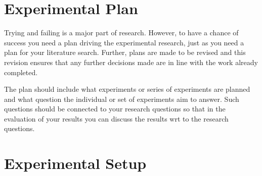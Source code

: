 \iffalse

\section{Experimental Plan}
\label{sec:experimentalPlan}

Trying and failing is a major part of research. However, to have a chance of success you need a plan driving the experimental research, just as you need a plan for your literature search. Further, plans are made to be revised and this revision ensures that any further decisions made are in line with the work already completed.  

The plan should include what experiments or series of experiments are planned and what question the individual or set of experiments aim to answer. Such questions should be connected to your research questions so that in the evaluation of your results you can discuss the results wrt to the research questions.  

\section{Experimental Setup}
\label{sec:experimentalSetup}

